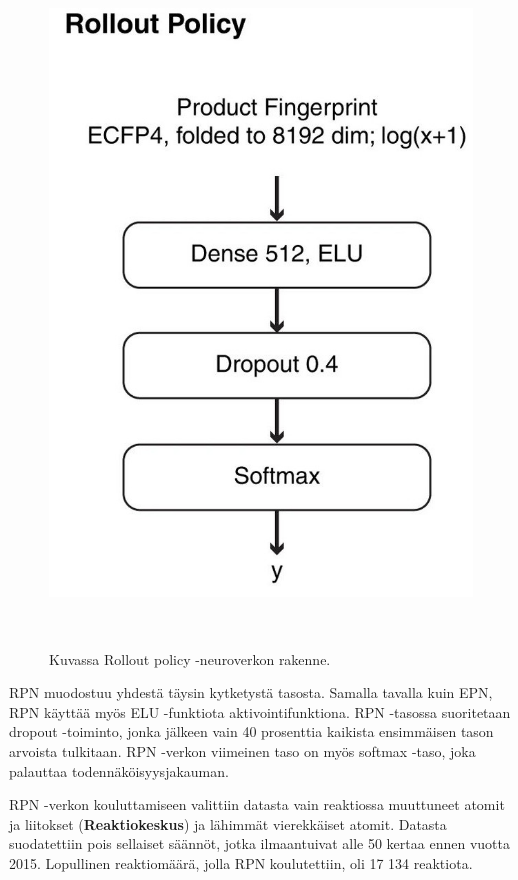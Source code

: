 \documentclass[finnish,twoside,censored,tkt,sw-line]{HYthesisML}
\begin{document}
\begin{figure}[!ht]
    \centering
    \includegraphics[]{rollout-policy.jpg}
    \caption{Kuvassa Rollout policy -neuroverkon rakenne.}
    {~\cite{SeglerMarwinHS2018Pcsw}}
    \label{fig:3n-mcts-rpn}
\end{figure}


RPN muodostuu yhdestä täysin kytketystä tasosta.
Samalla tavalla kuin EPN, RPN käyttää myös ELU -funktiota aktivointifunktiona.
RPN -tasossa suoritetaan dropout -toiminto, jonka jälkeen vain 40 prosenttia kaikista ensimmäisen tason arvoista tulkitaan.
RPN -verkon viimeinen taso on myös softmax -taso, joka palauttaa todennäköisyysjakauman.

RPN -verkon kouluttamiseen valittiin datasta vain reaktiossa muuttuneet atomit ja liitokset (\textbf{Reaktiokeskus}) ja lähimmät vierekkäiset atomit.
Datasta suodatettiin pois sellaiset säännöt, jotka ilmaantuivat alle 50 kertaa ennen vuotta 2015.
Lopullinen reaktiomäärä, jolla RPN koulutettiin, oli 17 134 reaktiota.
\end{document}
